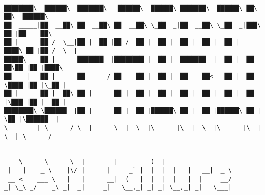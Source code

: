 \documentclass[varwidth=\maxdimen,margin=0.5cm,multi={verbatim}]{standalone}
\begin{document}
\begin{verbatim}

████████\  ██████\  ███████\   ██████\  ██████\ ███████\  ██████\ ██\   ██\  ██████\
██  _____|██  __██\ ██  __██\ ██  __██\ \_██  _|██  __██\ \_██  _|███\  ██ |██  __██\
██ |      ██ /  \__|██ |  ██ |██ /  ██ |  ██ |  ██ |  ██ |  ██ |  ████\ ██ |██ /  \__|
█████\    ██ |      ███████  |████████ |  ██ |  ███████  |  ██ |  ██ ██\██ |██ |████\
██  __|   ██ |      ██  ____/ ██  __██ |  ██ |  ██  __██<   ██ |  ██ \████ |██ |\_██ |
██ |      ██ |  ██\ ██ |      ██ |  ██ |  ██ |  ██ |  ██ |  ██ |  ██ |\███ |██ |  ██ |
████████\ \██████  |██ |      ██ |  ██ |██████\ ██ |  ██ |██████\ ██ | \██ |\██████  |
\________| \______/ \__|      \__|  \__|\______|\__|  \__|\______|\__|  \__| \______/
             
             
  _ \      \      \  |       _|        _)  |
 |   |    _ \    |\/ |      |     _` |  |  |  |   |   __|  _ \
 __ <    ___ \   |   |      __|  (   |  |  |  |   |  |     __/
_| \_\ _/    _\ _|  _|     _|   \__,_| _| _| \__,_| _|   \___|



\end{verbatim}
\end{document}
